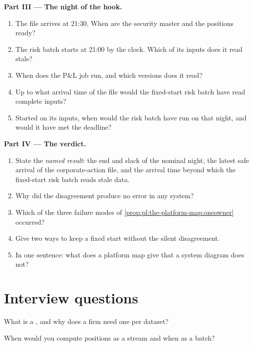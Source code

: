 \begin{problem}
\medskip\noindent\textbf{Part III --- The night of the hook.}
\begin{enumerate}[resume]
\item The file arrives at 21:30. When are the security master and the positions ready?
\item The risk batch starts at 21:00 by the clock. Which of its inputs does it read stale?
\item When does the P\&L job run, and which versions does it read?
\item Up to what arrival time of the file would the fixed-start risk batch have read complete inputs?
\item Started on its inputs, when would the risk batch have run on that night, and would it have met the deadline?
\end{enumerate}

\medskip\noindent\textbf{Part IV --- The verdict.}
\begin{enumerate}[resume]
\item State the \emph{named result}: the end and slack of the nominal night, the latest safe arrival of the corporate-action
file, and the arrival time beyond which the fixed-start risk batch reads stale data.
\item Why did the disagreement produce no error in any system?
\item Which of the three failure modes of \cref{prop:pl:the-platform-map:oneowner} occurred?
\item Give two ways to keep a fixed start without the silent disagreement.
\item In one sentence: what does a platform map give that a system diagram does not?
\end{enumerate}
\end{problem}

\section{Interview questions}

\begin{interviewq}\label{iq:pl:the-platform-map:1}
What is a , and why does a firm need one per dataset?
\end{interviewq}

\begin{interviewq}\label{iq:pl:the-platform-map:2}
When would you compute positions as a stream and when as a batch?
\end{interviewq}

